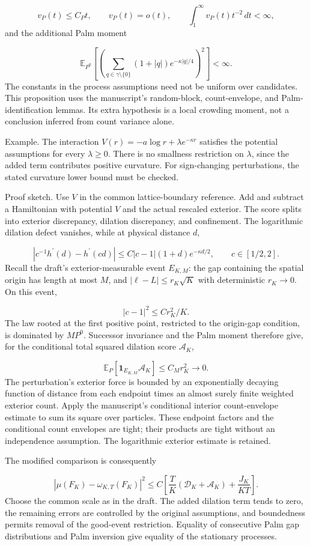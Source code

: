 \documentclass[11pt]{article}
\begin{document}
\[
v_P(t)\leq C_Pt,\qquad v_P(t)=o(t),\qquad \int_1^\infty v_P(t)t^{-2}\,dt<\infty,
\]
and the additional Palm moment

\[
\mathbb E_{P^0}\left[\left(\sum_{q\in\gamma\setminus\{0\}}(1+|q|)e^{-\kappa|q|/4}\right)^2\right]<\infty.
\]
The constants in the process assumptions need not be uniform over candidates. This proposition uses the manuscript's random-block, count-envelope, and Palm-identification lemmas. Its extra hypothesis is a local crowding moment, not a conclusion inferred from count variance alone.

Example. The interaction $V(r)=-a\log r+\lambda e^{-\kappa r}$ satisfies the potential assumptions for every $\lambda\geq0$. There is no smallness restriction on $\lambda$, since the added term contributes positive curvature. For sign-changing perturbations, the stated curvature lower bound must be checked.

Proof sketch. Use $V$ in the common lattice-boundary reference. Add and subtract a Hamiltonian with potential $V$ and the actual rescaled exterior. The score splits into exterior discrepancy, dilation discrepancy, and confinement. The logarithmic dilation defect vanishes, while at physical distance $d$,

\[
|c^{-1}h^{\prime}(d)-h^{\prime}(cd)|\leq C|c-1|(1+d)e^{-\kappa d/2},\qquad c\in[1/2,2].
\]
Recall the draft's exterior-measurable event $E_{K,M}$: the gap containing the spatial origin has length at most $M$, and $|\ell-L|\leq r_K\sqrt{K}$ with deterministic $r_K\to0$. On this event,

\[
|c-1|^2\leq C r_K^2/K.
\]
The law rooted at the first positive point, restricted to the origin-gap condition, is dominated by $MP^0$. Successor invariance and the Palm moment therefore give, for the conditional total squared dilation score $\mathcal A_K$,

\[
\mathbb E_P[\mathbf 1_{E_{K,M}}\mathcal A_K]\leq C_Mr_K^2\longrightarrow0.
\]
The perturbation's exterior force is bounded by an exponentially decaying function of distance from each endpoint times an almost surely finite weighted exterior count. Apply the manuscript's conditional interior count-envelope estimate to sum its square over particles. These endpoint factors and the conditional count envelopes are tight; their products are tight without an independence assumption. The logarithmic exterior estimate is retained.

The modified comparison is consequently

\[
|\mu(F_K)-\omega_{K,T}(F_K)|^2\leq C\left[\frac{T}{K}(\mathcal D_K+\mathcal A_K)+\frac{J_K}{KT}\right].
\]
Choose the common scale as in the draft. The added dilation term tends to zero, the remaining errors are controlled by the original assumptions, and boundedness permits removal of the good-event restriction. Equality of consecutive Palm gap distributions and Palm inversion give equality of the stationary processes.
\end{document}
